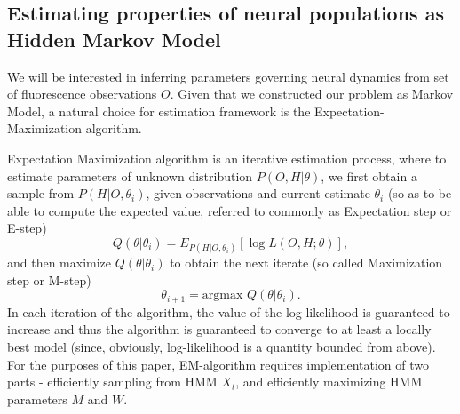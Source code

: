 \documentclass[amsmath,amssymb]{revtex4}
\begin{document}
\subsection{\label{sec:methods:estimating_parameters}Estimating properties of neural populations as Hidden Markov Model}
We will be interested in inferring parameters governing neural dynamics from set of fluorescence observations $O$. Given that we constructed our problem as Markov Model, a natural choice for estimation framework is the Expectation-Maximization algorithm.

Expectation Maximization algorithm is an iterative estimation process, where to estimate parameters of unknown distribution $P(O,H|\theta)$, we first obtain a sample from $P(H | O,\theta_i)$, given observations and current estimate $\theta_i$ (so as to be able to compute the expected value, referred to commonly as Expectation step or E-step)
\begin{equation}\label{eqn:Estep:definition}
Q(\theta|\theta_i)=E_{P(H|O,\theta_i)}\left[\log L(O,H;\theta)\right],
\end{equation}
and then maximize $Q(\theta|\theta_i)$ to obtain the next iterate
(so called Maximization step or M-step)
\begin{equation}
\theta_{i+1}=\text{argmax }Q(\theta|\theta_i).
\end{equation}
In each iteration of the algorithm, the value of the log-likelihood is guaranteed to increase and thus the algorithm is guaranteed to converge to at least a locally best model (since, obviously, log-likelihood is a quantity bounded from above). For the purposes of this paper, EM-algorithm requires implementation of two parts - efficiently sampling from HMM $X_t$, and efficiently maximizing HMM parameters $M$ and $W$.
\end{document}
